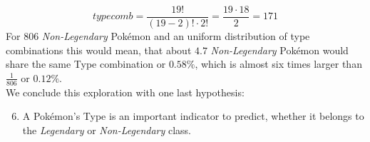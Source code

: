 \documentclass[conference]{IEEEtran}
\begin{document}
\begin{equation}
	typecomb  = \frac{19!}{(19-2)!\cdot 2!}
		= \frac{19 \cdot 18}{2} 
	 = 171
\end{equation}
For $806$ \textit{Non-Legendary} Pokémon and an uniform distribution of type combinations this would mean, that about $4.7$ \textit{Non-Legendary} Pokémon would share the same Type combination or $0.58\%$, which is almost six times larger than $\frac{1}{806}$ or $0.12\%$.\\
We conclude this exploration with one last hypothesis:
\begin{enumerate}
	\setcounter{enumi}{5}
	\item A Pokémon's Type is an important indicator to predict, whether it belongs to the \textit{Legendary} or \textit{Non-Legendary} class.
\end{enumerate}
\FloatBarrier
\end{document}
